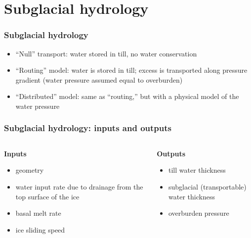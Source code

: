 \documentclass[hide notes,intlimits]{beamer}
\begin{document}
\section{Subglacial hydrology}
\label{sec:subglacial-hydrology}

\begin{frame}
  \frametitle{Subglacial hydrology}

  \begin{itemize}
  \item ``Null'' transport: water stored in till, no water conservation
  \item ``Routing'' model: water is stored in till; excess is
    transported along pressure gradient (water pressure assumed equal
    to overburden)
  \item ``Distributed'' model: same as ``routing,'' but with a
    physical model of the water pressure
  \end{itemize}
\end{frame}

\begin{frame}
  \frametitle{Subglacial hydrology: inputs and outputs}

  \begin{columns}[t]
    \begin{column}{0.5\linewidth}
      \textbf{Inputs}

      \begin{itemize}
      \item geometry
      \item water input rate due to drainage from the top surface of the ice
      \item basal melt rate
      \item ice sliding speed
      \end{itemize}
    \end{column}
    \begin{column}{0.5\linewidth}
      \textbf{Outputs}

      \begin{itemize}
      \item till water thickness
      \item subglacial (transportable) water thickness
      \item overburden pressure
      \end{itemize}
    \end{column}
  \end{columns}

\end{frame}
\end{document}
